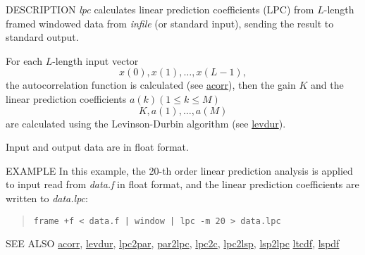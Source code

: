 \begin{synopsis}
\item [lpc] [ --l $L$ ] [ --m $M$ ] [ --f $F$ ] [ {\em infile} ] 
\end{synopsis}

\begin{qsection}{DESCRIPTION}
{\em lpc} calculates linear prediction coefficients (LPC) 
from $L$-length framed windowed data from {\em infile} (or standard input), 
sending the result to standard output.

For each $L$-length input vector
\begin{displaymath}
  x(0),x(1),\ldots,x(L-1), 
\end{displaymath}
the autocorrelation function is calculated (see \hyperlink{acorr}{acorr}),
then the gain $K$ and the linear prediction coefficients 
$a(k) (1 \leq k \leq M)$ 
\begin{displaymath}
  K, a(1), \ldots, a(M)
\end{displaymath}
are calculated using the Levinson-Durbin algorithm (see \hyperlink{levdur}{levdur}). 

Input and output data are in float format.
\end{qsection}

\begin{options}
\end{options}

\begin{qsection}{EXAMPLE}
In this example, the 20-th order linear prediction analysis is applied
to input read from {\em data.f} in float format,
and the linear prediction coefficients are written to
{\em data.lpc}:
\begin{quote}
 \verb!frame +f < data.f | window | lpc -m 20 > data.lpc!
\end{quote} 
\end{qsection}

\begin{qsection}{SEE ALSO}
\hyperlink{acorr}{acorr},
\hyperlink{levdur}{levdur},
\hyperlink{lpc2par}{lpc2par},
\hyperlink{par2lpc}{par2lpc},
\hyperlink{lpc2c}{lpc2c},
\hyperlink{lpc2lsp}{lpc2lsp},
\hyperlink{lsp2lpc}{lsp2lpc}
\hyperlink{ltcdf}{ltcdf},
\hyperlink{lspdf}{lspdf}
\end{qsection}
